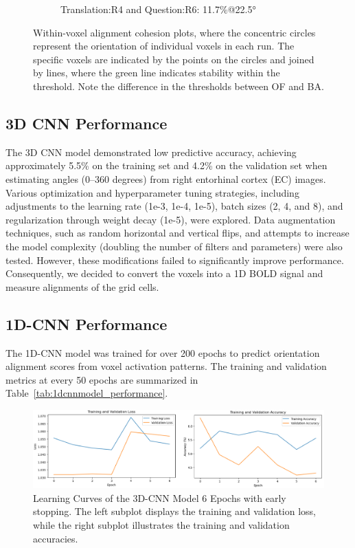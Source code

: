 \documentclass[a4paper]{article}
\begin{document}
\begin{figure}
\begin{subfigure}[b]{0.45\textwidth}
        \caption{Translation:R4 and Question:R6: 11.7\%@22.5°}
        \label{fig:stable_BA_run_ques}
    \end{subfigure}
    \caption{Within-voxel alignment cohesion plots, where the concentric circles represent the orientation of individual voxels in each run. The specific voxels are indicated by the points on the circles and joined by lines, where the green line indicates stability within the threshold. Note the difference in the thresholds between OF and BA.}
    \label{fig:stability_voxels}
\end{figure}

\subsection{\textbf{3D CNN Performance}}
The 3D CNN model demonstrated low predictive accuracy, achieving approximately 5.5\% on the training set and 4.2\% on the validation set when estimating angles (0–360 degrees) from right entorhinal cortex (EC) images. Various optimization and hyperparameter tuning strategies, including adjustments to the learning rate (1e-3, 1e-4, 1e-5), batch sizes (2, 4, and 8), and regularization through weight decay (1e-5), were explored. Data augmentation techniques, such as random horizontal and vertical flips, and attempts to increase the model complexity (doubling the number of filters and parameters) were also tested. However, these modifications failed to significantly improve performance. Consequently, we decided to convert the voxels into a 1D BOLD signal and measure alignments of the grid cells.



\subsection{\textbf{1D-CNN Performance}}
The 1D-CNN model was trained for over 200 epochs to predict orientation alignment scores from voxel activation patterns. The training and validation metrics at every 50 epochs are summarized in Table~\ref{tab:1dcnnmodel_performance}.
\begin{figure}
    \centering
    \includegraphics[width=1\linewidth]{final_report/3D_CNN_results.png}
    \caption{Learning Curves of the 3D-CNN Model 6 Epochs with early stopping. The left subplot displays the training and validation loss, while the right subplot illustrates the training and validation accuracies.}
    \label{fig:3DCNN}
\end{figure}
\end{document}

